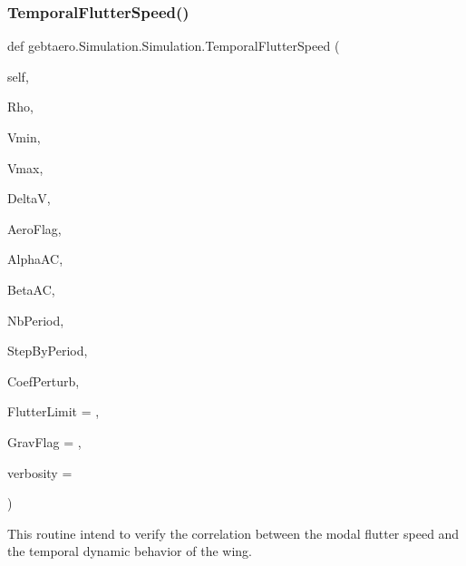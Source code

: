 \subsubsection{\texorpdfstring{Temporal\+Flutter\+Speed()}{TemporalFlutterSpeed()}}
{\footnotesize\ttfamily def gebtaero.\+Simulation.\+Simulation.\+Temporal\+Flutter\+Speed (\begin{DoxyParamCaption}\item[{}]{self,  }\item[{}]{Rho,  }\item[{}]{Vmin,  }\item[{}]{Vmax,  }\item[{}]{DeltaV,  }\item[{}]{Aero\+Flag,  }\item[{}]{Alpha\+AC,  }\item[{}]{Beta\+AC,  }\item[{}]{Nb\+Period,  }\item[{}]{Step\+By\+Period,  }\item[{}]{Coef\+Perturb,  }\item[{}]{Flutter\+Limit = {},  }\item[{}]{Grav\+Flag = {},  }\item[{}]{verbosity = {} }\end{DoxyParamCaption})}



This routine intend to verify the correlation between the modal flutter speed and the temporal dynamic behavior of the wing. 

